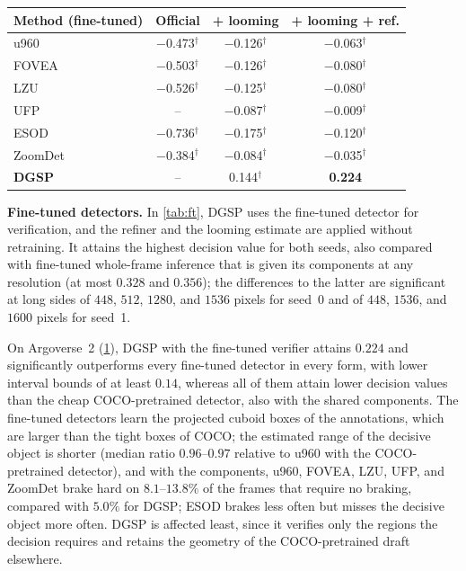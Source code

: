 \documentclass[10pt,letterpaper]{article}
\newcommand{\method}{DGSP\xspace}
\newcommand{\best}[1]{\textbf{#1}}
\newcommand{\oursrow}{\rowcolor{oursbg}}
\newcommand{\na}{--}
\theoremstyle{remark}
\theoremstyle{plain}
\theoremstyle{definition}
\begin{document}
\begin{table}[!htbp]
\begin{minipage}[t]{0.53\linewidth}
\label{tab:ft_av2}
\small
\setlength{\tabcolsep}{4pt}
\begin{tabular}{@{}lccc@{}}
\toprule
Method (fine-tuned) & Official & + looming & + looming + ref. \\
\midrule
u960 & $-$0.473$^{\dagger}$ & $-$0.126$^{\dagger}$ & $-$0.063$^{\dagger}$ \\
FOVEA~\cite{fovea} & $-$0.503$^{\dagger}$ & $-$0.126$^{\dagger}$ & $-$0.080$^{\dagger}$ \\
LZU~\cite{lzu} & $-$0.526$^{\dagger}$ & $-$0.125$^{\dagger}$ & $-$0.080$^{\dagger}$ \\
UFP~\cite{ufpmp} & \na & $-$0.087$^{\dagger}$ & $-$0.009$^{\dagger}$ \\
ESOD~\cite{esod} & $-$0.736$^{\dagger}$ & $-$0.175$^{\dagger}$ & $-$0.120$^{\dagger}$ \\
ZoomDet~\cite{zoomdet} & $-$0.384$^{\dagger}$ & $-$0.084$^{\dagger}$ & $-$0.035$^{\dagger}$ \\
\midrule
\oursrow \textbf{\method} & \na & 0.144$^{\dagger}$ & \best{0.224} \\
\bottomrule
\end{tabular}
\end{minipage}
\end{table}

\noindent\textbf{Fine-tuned detectors.}
In \cref{tab:ft}, \method uses the fine-tuned detector for verification, and the refiner and the looming estimate are applied without retraining.
It attains the highest decision value for both seeds, also compared with fine-tuned whole-frame inference that is given its components at any resolution (at most $0.328$ and $0.356$); the differences to the latter are significant at long sides of $448$, $512$, $1280$, and $1536$ pixels for seed~0 and of $448$, $1536$, and $1600$ pixels for seed~1.

On Argoverse~2 (\cref{tab:ft_av2}), \method with the fine-tuned verifier attains $0.224$ and significantly outperforms every fine-tuned detector in every form, with lower interval bounds of at least $0.14$, whereas all of them attain lower decision values than the cheap COCO-pretrained detector, also with the shared components.
The fine-tuned detectors learn the projected cuboid boxes of the annotations, which are larger than the tight boxes of COCO; the estimated range of the decisive object is shorter (median ratio $0.96$--$0.97$ relative to u960 with the COCO-pretrained detector), and with the components, u960, FOVEA, LZU, UFP, and ZoomDet brake hard on $8.1$--$13.8\%$ of the frames that require no braking, compared with $5.0\%$ for \method; ESOD brakes less often but misses the decisive object more often.
\method is affected least, since it verifies only the regions the decision requires and retains the geometry of the COCO-pretrained draft elsewhere.
\end{document}
